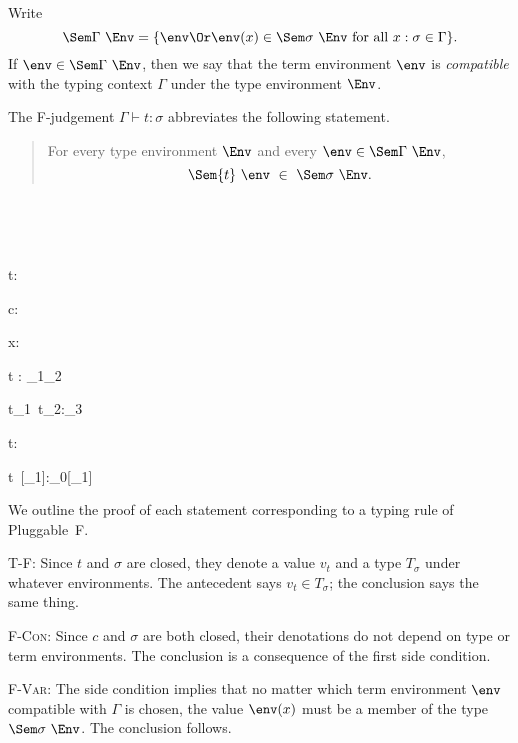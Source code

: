 \documentclass{amsart}
\begin{document}

Write
\[
\Sem\Gamma~\Env =
\{
\env\Or
\env(x)\in\Sem\sigma~\Env\text{ for all }
x:\sigma\in\Gamma
\}.
\]
If $\env\in\Sem\Gamma~\Env$, then we say that the term
environment $\env$ is \emph{compatible} with the typing context
$\Gamma$ under the type environment $\Env$.

The F-judgement $\Gamma\vdash t:\sigma$ abbreviates the
following statement.
\begin{quotation}
For every type environment $\Env$ and every $\env\in\Sem\Gamma~\Env$,
\[
\Sem{t}~\env~\in~\Sem\sigma~\Env.
\]
\end{quotation}~


~

{t:\sigma}

{\Gamma\vdash c:\sigma}

{\Gamma\vdash x:\sigma}

{\Gamma\vdash{}t : \sigma_1\R\sigma_2}

{\Gamma\vdash t_1~t_2:\sigma_3}

{\Gamma\vdash\Tabs\alpha t:\All\alpha\sigma}

{\Gamma\vdash t~[\sigma_1]:\sigma_0[\alpha\mapsto\sigma_1]}


\label{sound-F}

We outline the proof of each statement corresponding to a typing
rule of Pluggable~F.

\textsc{T-F}: Since $t$ and $\sigma$ are closed, they denote a
value $v_t$ and a type $T_\sigma$ under whatever environments.
The antecedent says $v_t\in T_\sigma$; the conclusion says the
same thing.

\textsc{F-Con}: Since $c$ and $\sigma$ are both closed, their
denotations do not depend on type or term environments. The
conclusion is a consequence of the first side condition.

\textsc{F-Var}: The
side condition implies that no matter which term environment
$\env$ compatible with $\Gamma$ is chosen, the value $\env(x)$
must be a member of the type $\Sem\sigma~\Env$. The conclusion
follows.
\end{document}
